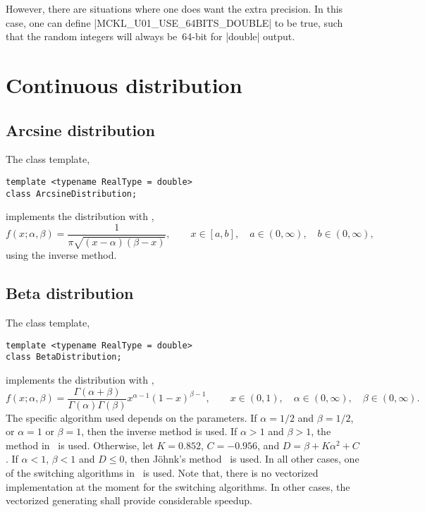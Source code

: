 However, there are situations where one does want the extra precision. In this
case, one can define |MCKL_U01_USE_64BITS_DOUBLE| to be true, such that the
random integers will always be~64-bit for |double| output.

\section{Continuous distribution}
\label{sec:Continuous distribution}

\subsection{Arcsine distribution}
\label{sub:Arcsine distribution}

The class template,
\begin{verbatim}
template <typename RealType = double>
class ArcsineDistribution;
\end{verbatim}
implements the distribution with \pdf,
\begin{equation*}
  f(x;\alpha,\beta) = \frac{1}{\pi\sqrt{(x - \alpha)(\beta - x)}},\qquad
  x \in [a, b],\quad a \in (0,\infty),\quad b \in (0,\infty),
\end{equation*}
using the inverse method.

\subsection{Beta distribution}
\label{sub:Beta distribution}

The class template,
\begin{verbatim}
template <typename RealType = double>
class BetaDistribution;
\end{verbatim}
implements the distribution with \pdf,
\begin{equation*}
  f(x;\alpha,\beta) =
  \frac{\Gamma(\alpha + \beta)}{\Gamma(\alpha)\Gamma(\beta)}
  x^{\alpha - 1}(1 - x)^{\beta - 1},\qquad
  x \in (0, 1),\quad \alpha \in (0,\infty),\quad \beta \in (0,\infty).
\end{equation*}
The specific algorithm used depends on the parameters. If $\alpha = 1/2$ and
$\beta = 1/2$, or $\alpha = 1$ or $\beta = 1$, then the inverse method is used.
If $\alpha > 1$ and $\beta > 1$, the method in~\cite{Cheng:1978jl} is used.
Otherwise, let $K = 0.852$, $C = -0.956$, and $D = \beta + K\alpha^2 + C$. If
$\alpha < 1$, $\beta < 1$ and $D \le 0$, then Jöhnk's
method~\cite[sec.~3.5]{Devroye:1986gi} is used. In all other cases, one of the
switching algorithms in~\cite{Atkinson:1979es} is used. Note that, there is no
vectorized implementation at the moment for the switching algorithms. In other
cases, the vectorized generating shall provide considerable speedup.

